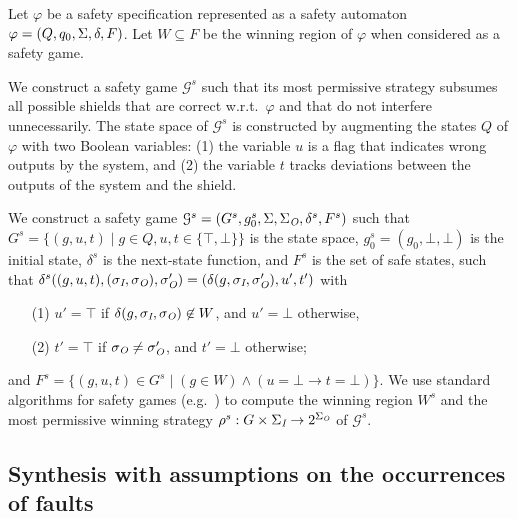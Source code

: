Let $\varphi$ be a safety specification represented as a safety automaton $\varphi = (Q, q_0, \Sigma, \delta, F)$.
Let $W \subseteq F$ be the winning region of $\varphi$ when considered as a safety game.

We construct a safety game $\mathcal G^s$ such that its most permissive strategy subsumes all possible shields that are correct w.r.t.\ $\varphi$ and that do not interfere unnecessarily.
%
The state space of $\mathcal G^s$ is constructed by augmenting the states $Q$ of $\varphi$ with two Boolean variables:
(1) the variable $u$ is a flag that indicates wrong outputs by the system, and (2) the variable $t$ tracks deviations between the outputs of the system and the shield.

We construct a safety game $\mathcal G^s = (G^s, g_0^s,\Sigma,\Sigma_{\textit{O}},\delta^s, F^s)$ such that
$G^s = \{(g,u,t) \mid g \in Q, u, t \in \{\top,\bot\}\}$ is the state space,
$g_0^s = (g_0,\bot,\bot)$ is the initial state,
$\delta^s$ is the next-state function, and $F^s$ is the set of safe states, such that
$\delta^s((g,u,t),(\sigma_{\textit{I}},\sigma_{\textit{O}}),\sigma_{\textit{O}}')=(\delta(g,\sigma_{\textit{I}},\sigma_{\textit{O}}'),u',t')$
with
\begin{itemize}
\item[(1)] $u' = \top$ if $\delta(g,\sigma_{\textit{I}},\sigma_{\textit{O}}) \not \in W$, and $u' = \bot$ otherwise,
\item[(2)] $t' = \top$ if $\sigma_{\textit{O}}\neq \sigma_{\textit{O}}'$, and $t' = \bot$ otherwise;
\end{itemize}
and $F^s=\{(g,u,t)\in G^s \mid (g\in W) \wedge (u=\bot \rightarrow t=\bot)\}$.
We use standard algorithms for safety games (e.g.~\cite{Mazala01})
to compute the winning region $W^s$ and the most permissive winning strategy $\rho^s: G \times \Sigma_{\textit{I}} \rightarrow 2^{\Sigma_{\textit{O}}}$ of $\mathcal G^s$.

\subsection{Synthesis with assumptions on the occurrences of faults}

